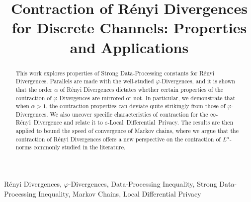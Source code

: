 \documentclass[conference,letterpaper]{IEEEtran}
\begin{document}
\title{Contraction of R\'enyi Divergences for Discrete Channels: Properties and Applications} 

\author{%
  \and
    \and
}

\maketitle

\begin{abstract}
   This work explores properties of Strong Data-Processing constants for R\'enyi Divergences. Parallels are made with the well-studied $\varphi$-Divergences, and it is shown that the order $\alpha$ of R\'enyi Divergences dictates whether certain properties of the contraction of $\varphi$-Divergences are mirrored or not. In particular, we demonstrate that when $\alpha>1$, the contraction properties can deviate quite strikingly from those of $\varphi$-Divergences. We also uncover specific characteristics of contraction for the \mbox{$\infty$-R\'enyi Divergence} and relate it to \mbox{$\varepsilon$-Local Differential Privacy}. The results are then applied to bound the speed of convergence of Markov chains, where we argue that the contraction of R\'enyi Divergences offers a new perspective on the contraction of \mbox{$L^\alpha$-norms} commonly studied in the literature.
   \end{abstract}
\begin{IEEEkeywords}
    R\'enyi Divergences, $\varphi$-Divergences, Data-Processing Inequality, Strong Data-Processing Inequality, Markov Chains, Local Differential Privacy
\end{IEEEkeywords}
\end{document}
